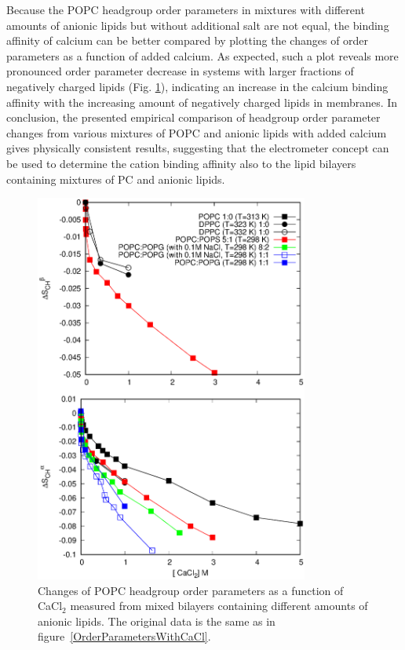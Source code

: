 \documentclass[journal=jpcbfk,manuscript=article]{achemso}
\begin{document}
Because the POPC headgroup order parameters in mixtures with different amounts of anionic lipids
but without additional salt are not equal, the binding affinity of calcium can be better compared
by plotting the changes of order parameters as a function of added calcium.
As expected, such a plot reveals more pronounced order parameter decrease in systems
with larger fractions of negatively charged lipids (Fig. \ref{OrderParameterCHANGESWithCaClBELOW1M}),
indicating an increase in the calcium binding affinity with the increasing amount of negatively charged
lipids in membranes. In conclusion, the presented empirical comparison of headgroup order parameter changes
from various mixtures of POPC and anionic lipids with added calcium gives physically
consistent results, suggesting that the electrometer concept can be used to determine
the cation binding affinity also to the lipid bilayers containing mixtures of PC and anionic lipids.  
\begin{figure}[]
  \centering
  \includegraphics[width=9.0cm]{../Figs/CHANGESwithCaCl.eps}
  \caption{\label{OrderParameterCHANGESWithCaClBELOW1M}
    Changes of POPC headgroup order parameters as a function of CaCl$_2$
    measured from mixed bilayers containing different amounts of anionic lipids.
    The original data is the same as in figure~\ref{OrderParametersWithCaCl}.
  }
\end{figure}
\end{document}

